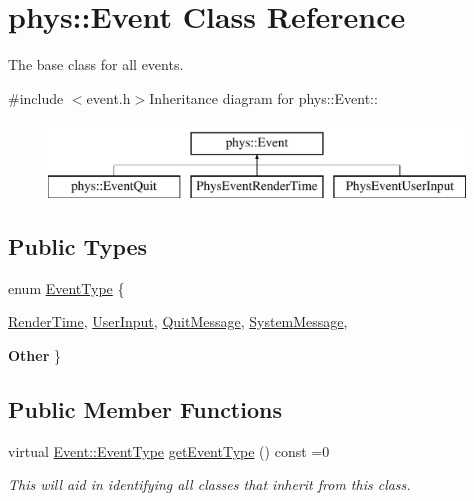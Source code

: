 \hypertarget{classphys_1_1Event}{
\section{phys::Event Class Reference}
\label{d5/dcb/classphys_1_1Event}
}


The base class for all events.  


{\ttfamily \#include $<$event.h$>$}Inheritance diagram for phys::Event::\begin{figure}[H]
\begin{center}
\leavevmode
\includegraphics[height=2cm]{d5/dcb/classphys_1_1Event}
\end{center}
\end{figure}
\subsection*{Public Types}
\begin{DoxyCompactItemize}
\item 
enum \hyperlink{classphys_1_1Event_af5fdbb3e08d8e578d58770fbc606fda7}{EventType} \{ \par
\hyperlink{classphys_1_1Event_af5fdbb3e08d8e578d58770fbc606fda7a72c30ea5e5c4f5cb55382ad0d1317aa8}{RenderTime}, 
\hyperlink{classphys_1_1Event_af5fdbb3e08d8e578d58770fbc606fda7a91c3cf8e29385c1e10925d3bd4778cfc}{UserInput}, 
\hyperlink{classphys_1_1Event_af5fdbb3e08d8e578d58770fbc606fda7a085b70182742e0cc874f04f8aa615ff0}{QuitMessage}, 
\hyperlink{classphys_1_1Event_af5fdbb3e08d8e578d58770fbc606fda7a7558324b74ee7b6ec1e69d7ab1a13749}{SystemMessage}, 
\par
{\bfseries Other}
 \}
\end{DoxyCompactItemize}
\subsection*{Public Member Functions}
\begin{DoxyCompactItemize}
\item 
virtual \hyperlink{classphys_1_1Event_af5fdbb3e08d8e578d58770fbc606fda7}{Event::EventType} \hyperlink{classphys_1_1Event_ac2c0623a6bc399e62f4b9fb2c022ea73}{getEventType} () const =0
\begin{DoxyCompactList}\small\item\em This will aid in identifying all classes that inherit from this class. \item\end{DoxyCompactList}\end{DoxyCompactItemize}


